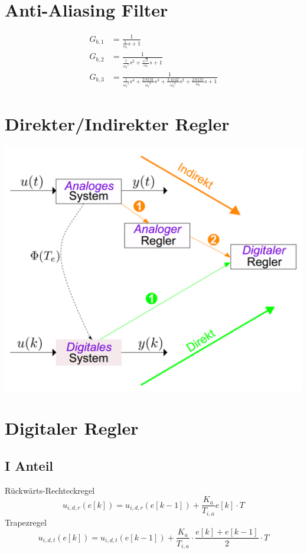 \section{Anti-Aliasing Filter}
\[\begin{aligned}
	G_{b,1} &= \frac{1}{\frac{1}{\omega_b}s+1}\\
	G_{b,2} &= \frac{1}{\frac{1}{{\omega_b}^2}s^2+\frac{\sqrt{2}}{\omega_b}s+1}\\
	G_{b,3} &= \frac{1}{\frac{1}{{\omega_b}^4}s^4+\frac{2.6131}{{\omega_b}^3}s^3+\frac{3.4142}{{\omega_b}^2}s^2+\frac{2.6131}{\omega_b}s+1}
\end{aligned}\]
\section{Direkter/Indirekter Regler}
\begin{center}
	\includegraphics[scale = 0.25]{images/direkter_indirekter.png}
\end{center}

\section{Digitaler Regler}
\subsection{I Anteil}
Rückwärts-Rechteckregel
\[
	u_{i,d,r}(e[k])=u_{i,d,r}(e[k-1])+\frac{K_a}{T_{i,a}}e[k]\cdot T
\]
Trapezregel
\[
	u_{i,d,t}(e[k])=u_{i,d,t}(e[k-1])+\frac{K_a}{T_{i,a}}\cdot \frac{e[k]+e[k-1]}{2}\cdot T
\]
